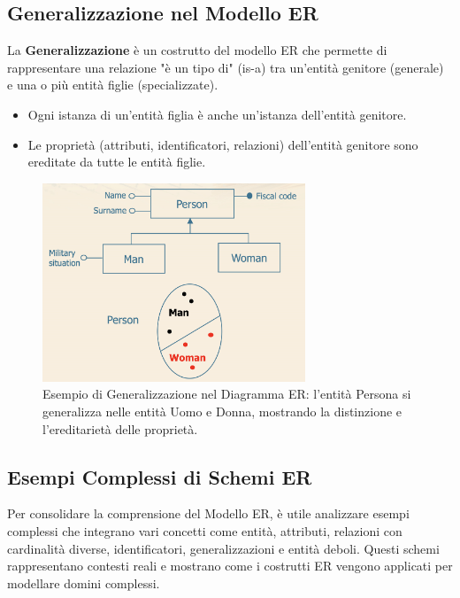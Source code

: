 \subsection{Generalizzazione nel Modello ER}
La \textbf{Generalizzazione} è un costrutto del modello ER che permette di rappresentare una relazione "è un tipo di" (is-a) tra un'entità genitore (generale) e una o più entità figlie (specializzate).
\begin{itemize}
    \item Ogni istanza di un'entità figlia è anche un'istanza dell'entità genitore.
    \item Le proprietà (attributi, identificatori, relazioni) dell'entità genitore sono ereditate da tutte le entità figlie.
\end{itemize}
\begin{figure}[h!]
    \centering
    \includegraphics[width=0.7\textwidth]{immagini/er_generalizzazione_person_gender.png} %
    \caption{Esempio di Generalizzazione nel Diagramma ER: l'entità Persona si generalizza nelle entità Uomo e Donna, mostrando la distinzione e l'ereditarietà delle proprietà.}
    \label{fig:er_generalizzazione_person_gender}
\end{figure}

\subsection{Esempi Complessi di Schemi ER}
Per consolidare la comprensione del Modello ER, è utile analizzare esempi complessi che integrano vari concetti come entità, attributi, relazioni con cardinalità diverse, identificatori, generalizzazioni e entità deboli. Questi schemi rappresentano contesti reali e mostrano come i costrutti ER vengono applicati per modellare domini complessi.

